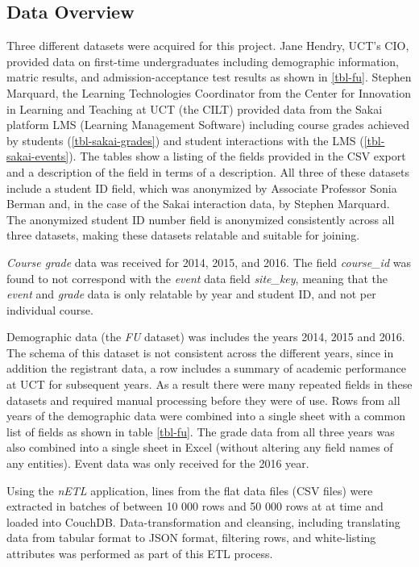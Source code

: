 \subsection{Data Overview}
Three different datasets were acquired for this project. Jane Hendry, UCT's CIO, provided data on first-time undergraduates including demographic information, matric results, and admission-acceptance test results as shown in \ref{tbl-fu}. Stephen Marquard, the Learning Technologies Coordinator from the Center for Innovation in Learning and Teaching at UCT (the CILT) provided data from the Sakai platform LMS (Learning Management Software) including course grades achieved by students (\ref{tbl-sakai-grades}) and student interactions with the LMS (\ref{tbl-sakai-events}). The tables show a listing of the fields provided in the CSV export and a description of the field in terms of a description. All three of these datasets include a student ID field, which was anonymized by Associate Professor Sonia Berman and, in the case of the Sakai interaction data, by Stephen Marquard. The anonymized student ID number field is anonymized consistently across all three datasets, making these datasets relatable and suitable for joining.

\textit{Course grade} data was received for 2014, 2015, and 2016. The field \textit{course\_id} was found to not correspond with the \textit{event} data field \textit{site\_key}, meaning that the \textit{event} and \textit{grade} data is only relatable by year and student ID, and not per individual course.

Demographic data (the \textit{FU} dataset) was includes the years 2014, 2015 and 2016. The schema of this dataset is not consistent across the different years, since in addition the registrant data, a row includes a summary of academic performance at UCT for subsequent years. As a result there were many repeated fields in these datasets and required manual processing before they were of use. Rows from all years of the demographic data were combined into a single sheet with a common list of fields as shown in table \ref{tbl-fu}. The grade data from all three years was also combined into a single sheet in Excel (without altering any field names of any entities). Event data was only received for the 2016 year.

Using the \textit{nETL} application, lines from the flat data files (CSV files) were extracted in batches of between 10 000 rows and 50 000 rows at at time and loaded into CouchDB. Data-transformation and cleansing, including translating data from tabular format to JSON format, filtering rows, and white-listing attributes was performed as part of this ETL process.


